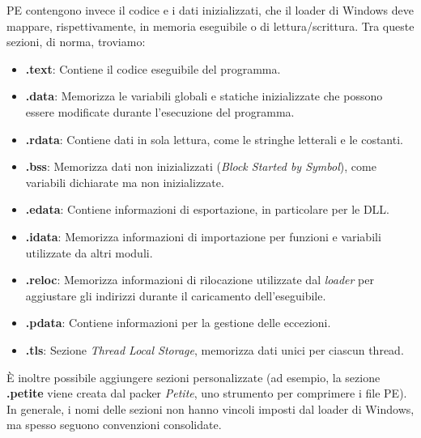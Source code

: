  PE contengono invece il codice e i dati inizializzati, che il loader di Windows deve mappare, rispettivamente, in memoria eseguibile o di lettura/scrittura. Tra queste sezioni, di norma, troviamo: 
\begin{itemize}
    \item \textbf{.text}: Contiene il codice eseguibile del programma.
    \item \textbf{.data}: Memorizza le variabili globali e statiche inizializzate che possono essere modificate durante l'esecuzione del programma.
	\item \textbf{.rdata}: Contiene dati in sola lettura, come le stringhe letterali e le costanti.
    \item \textbf{.bss}: Memorizza dati non inizializzati (\textit{Block Started by Symbol}), come variabili dichiarate ma non inizializzate.
    \item \textbf{.edata}: Contiene informazioni di esportazione, in particolare per le DLL.
    \item \textbf{.idata}: Memorizza informazioni di importazione per funzioni e variabili utilizzate da altri moduli.
    \item \textbf{.reloc}: Memorizza informazioni di rilocazione utilizzate dal \textit{loader} per aggiustare gli indirizzi durante il caricamento dell'eseguibile.
    \item \textbf{.pdata}: Contiene informazioni per la gestione delle eccezioni.
    \item \textbf{.tls}: Sezione \textit{Thread Local Storage}, memorizza dati unici per ciascun thread.
\end{itemize}    
È inoltre possibile aggiungere sezioni personalizzate (ad esempio, la sezione \textbf{.petite} viene creata dal packer \textit{Petite}, uno strumento per comprimere i file PE). In generale, i nomi delle sezioni non hanno vincoli imposti dal loader di Windows, ma spesso seguono convenzioni consolidate. 
